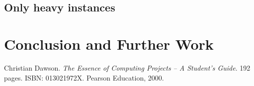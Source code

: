 \documentclass[]{final_report}
\begin{document}
\section{Only heavy instances}


\chapter{Conclusion and Further Work}


\newpage
\begin{thebibliography}{99}
 Christian Dawson. \emph{The Essence of Computing Projects -- A Student's Guide}. 192 pages. ISBN: 013021972X. Pearson Education, 2000.
\end{thebibliography}
\label{endpage}
\end{document}
